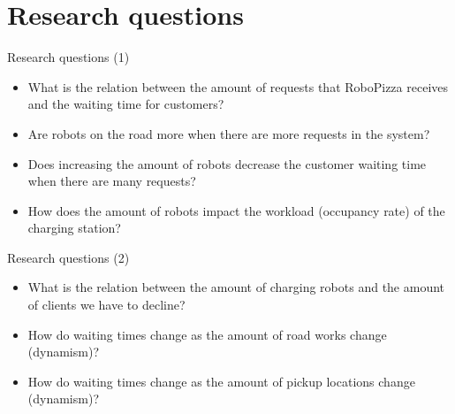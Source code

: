\section{Research questions}

\begin{frame}{Research questions (1)}
    \begin{itemize}
        \item What is the relation between the amount of requests that RoboPizza receives and the waiting time for customers?
        \item Are robots on the road more when there are more requests in the system?
        \item Does increasing the amount of robots decrease the customer waiting time when there are many requests?
        \item How does the amount of robots impact the workload (occupancy rate) of the charging station?
    \end{itemize}
\end{frame}


\begin{frame}{Research questions (2)}
    \begin{itemize}
        \item What is the relation between the amount of charging robots and the amount of clients we have to decline?
        \item How do waiting times change as the amount of road works change (dynamism)?
        \item How do waiting times change as the amount of pickup locations change (dynamism)?
    \end{itemize}
\end{frame}
